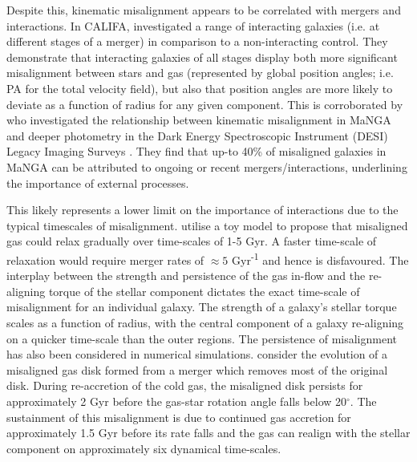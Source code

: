 Despite this, kinematic misalignment appears to be correlated with mergers and interactions. In CALIFA, \citet[][]{barrera2015} investigated a range of interacting galaxies (i.e. at different stages of a merger) in comparison to a non-interacting control. They demonstrate that interacting galaxies of all stages display both more significant misalignment between stars and gas (represented by global position angles; i.e. PA for the total velocity field), but also that position angles are more likely to deviate as a function of radius for any given component. This is corroborated by \citet{li_decoupling2019} who investigated the relationship between kinematic misalignment in MaNGA and deeper photometry in the Dark Energy Spectroscopic Instrument (DESI) Legacy Imaging Surveys \citep{dey2019}. They find that up-to 40\% of misaligned galaxies in MaNGA can be attributed to ongoing or recent mergers/interactions, underlining the importance of external processes. 

This likely represents a lower limit on the importance of interactions due to the typical timescales of misalignment. \citet{davis2016} utilise a toy model to propose that misaligned gas could relax gradually over time-scales of 1-5 Gyr. A faster time-scale of relaxation would require merger rates of $\approx 5$ Gyr\textsuperscript{-1} and hence is disfavoured. The interplay between the strength and persistence of the gas in-flow and the re-aligning torque of the stellar component dictates the exact time-scale of misalignment for an individual galaxy. The strength of a galaxy's stellar torque scales as a function of radius, with the central component of a galaxy re-aligning on a quicker time-scale than the outer regions. The persistence of misalignment has also been considered in numerical simulations. \citet{vdvoort2015} consider the evolution of a misaligned gas disk formed from a merger which removes most of the original disk. During re-accretion of the cold gas, the misaligned disk persists for approximately 2 Gyr before the gas-star rotation angle falls below 20$^{\circ}$. The sustainment of this misalignment is due to continued gas accretion for approximately 1.5 Gyr before its rate falls and the gas can realign with the stellar component on approximately six dynamical time-scales. 

